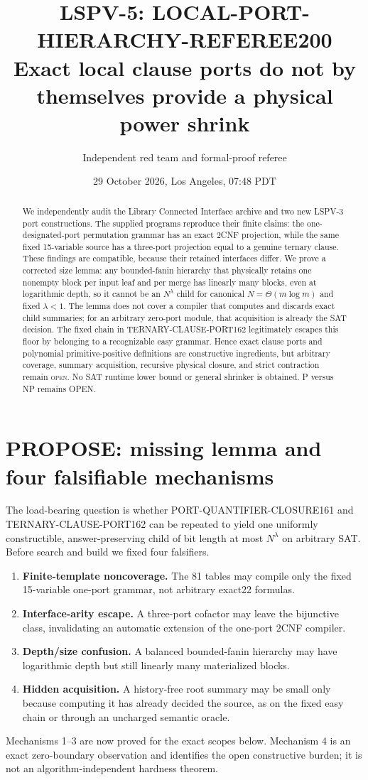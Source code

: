 \documentclass[11pt]{article}
\title{LSPV-5: LOCAL-PORT-HIERARCHY-REFEREE200\\[3pt]
\large Exact local clause ports do not by themselves provide a physical power shrink}
\author{Independent red team and formal-proof referee}
\date{29 October 2026, Los Angeles, 07:48 PDT}
\newcommand{\OPEN}{\textsc{open}}
\begin{document}
\maketitle

\begin{abstract}
We independently audit the Library Connected Interface archive and two new
LSPV-3 port constructions.  The supplied programs reproduce their finite
claims: the one-designated-port permutation grammar has an exact $2$CNF
projection, while the same fixed 15-variable source has a three-port
projection equal to a genuine ternary clause.  These findings are compatible,
because their retained interfaces differ.  We prove a corrected size lemma:
any bounded-fanin hierarchy that physically retains one nonempty block per
input leaf and per merge has linearly many blocks, even at logarithmic depth,
so it cannot be an $N^\lambda$ child for canonical
$N=\Theta(m\log m)$ and fixed $\lambda<1$.  The lemma does not cover a
compiler that computes and discards exact child summaries; for an arbitrary
zero-port module, that acquisition is already the SAT decision.  The fixed
chain in TERNARY-CLAUSE-PORT162 legitimately escapes this floor by belonging
to a recognizable easy grammar.  Hence exact clause ports and polynomial
primitive-positive definitions are constructive ingredients, but arbitrary
coverage, summary acquisition, recursive physical closure, and strict
contraction remain \OPEN.  No SAT runtime lower bound or general shrinker is
obtained.  P versus NP remains OPEN.
\end{abstract}

\section{PROPOSE: missing lemma and four falsifiable mechanisms}
The load-bearing question is whether PORT-QUANTIFIER-CLOSURE161 and
TERNARY-CLAUSE-PORT162 can be repeated to yield one uniformly constructible,
answer-preserving child of bit length at most $N^\lambda$ on arbitrary SAT.
Before search and build we fixed four falsifiers.
\begin{enumerate}
\item \textbf{Finite-template noncoverage.}  The 81 tables may compile only
the fixed 15-variable one-port grammar, not arbitrary exact22 formulas.
\item \textbf{Interface-arity escape.}  A three-port cofactor may leave the
bijunctive class, invalidating an automatic extension of the one-port $2$CNF
compiler.
\item \textbf{Depth/size confusion.}  A balanced bounded-fanin hierarchy may
have logarithmic depth but still linearly many materialized blocks.
\item \textbf{Hidden acquisition.}  A history-free root summary may be small
only because computing it has already decided the source, as on the fixed
easy chain or through an uncharged semantic oracle.
\end{enumerate}
Mechanisms 1--3 are now proved for the exact scopes below.  Mechanism 4 is an
exact zero-boundary observation and identifies the open constructive burden;
it is not an algorithm-independent hardness theorem.
\end{document}
